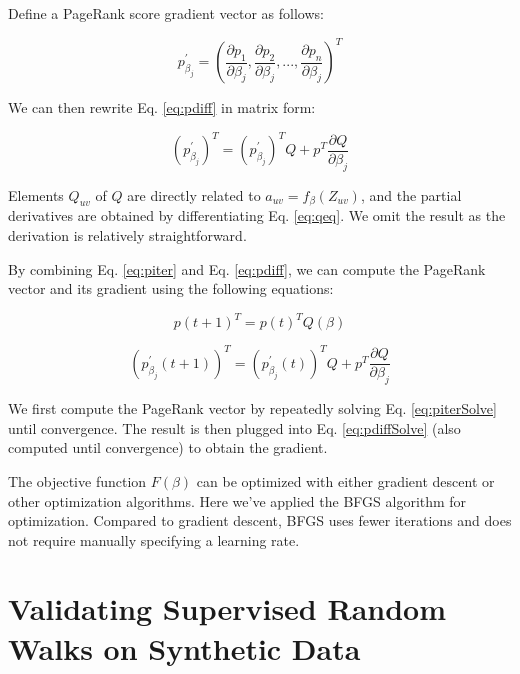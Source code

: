 \documentclass[10pt]{article}
\begin{document}
\begin{multicols}{2}
Define a PageRank score gradient vector as follows:

\begin{displaymath}
p^{\prime}_{\beta_{j}} = \left( \frac{\partial p_{1}}{\partial \beta_{j}},  \frac{\partial p_{2}}{\partial \beta_{j}} ,..., \frac{\partial p_{n}}{\partial \beta_{j}} \right)^{T}
\end{displaymath}

We can then rewrite Eq. \ref{eq:pdiff} in matrix form:

\begin{equation}
\left( p^{\prime}_{\beta_{j}} \right)^{T} = \left( p^{\prime}_{\beta_{j}} \right)^{T}Q + p^{T}\frac{\partial Q}{\partial \beta_{j}}
\end{equation}

Elements $Q_{uv}$ of $Q$ are directly related to $a_{uv} = f_{\beta}(Z_{uv})$, and the partial derivatives are obtained by differentiating Eq. \ref{eq:qeq}. We omit the result as the derivation is relatively straightforward.

By combining Eq. \ref{eq:piter} and Eq. \ref{eq:pdiff}, we can compute the PageRank vector and its gradient using the following equations:

\begin{equation} \label{eq:piterSolve}
p(t+1)^{T} = p(t)^{T} Q(\beta)
\end{equation}

\begin{equation} \label{eq:pdiffSolve}
\left( p^{\prime}_{\beta_{j}} (t+1)\right)^{T} = \left( p^{\prime}_{\beta_{j}} (t)\right)^{T}Q + p^{T}\frac{\partial Q}{\partial \beta_{j}}
\end{equation}

We first compute the PageRank vector by repeatedly solving Eq. \ref{eq:piterSolve} until convergence. The result is then plugged into Eq. \ref{eq:pdiffSolve} (also computed until convergence) to obtain the gradient.

The objective function $F(\beta)$ can be optimized with either gradient descent or other optimization algorithms. Here we've applied the BFGS algorithm for optimization. Compared to gradient descent, BFGS uses fewer iterations and does not require manually specifying a learning rate.

\section{Validating Supervised Random Walks on Synthetic Data}


\end{multicols}
\end{document}
